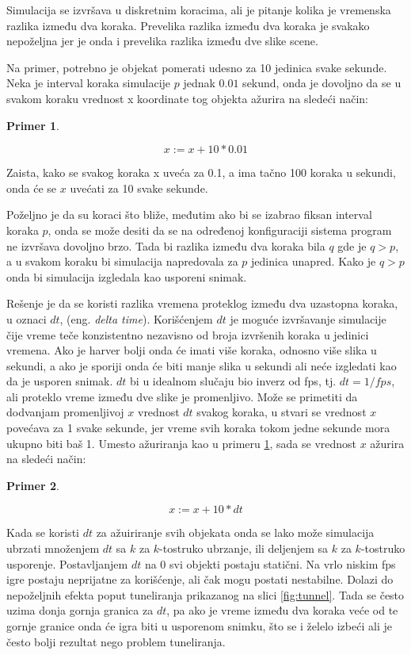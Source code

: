 \documentclass{article}
\newtheorem{primer}{Primer}[section]
\begin{document}
{Simulacija se izvršava u diskretnim koracima, ali je pitanje kolika je vremenska razlika između dva koraka.
Prevelika razlika između dva koraka je svakako nepoželjna jer je onda i prevelika razlika između dve slike scene.

Na primer, potrebno je objekat pomerati udesno za 10 jedinica svake sekunde. Neka je interval koraka simulacije 
$p$ jednak $0.01$ sekund, onda je dovoljno da se u svakom koraku vrednost x koordinate tog objekta ažurira na sledeći način:

\begin{primer}
\label{pr:x}

$$ x:= x + 10 * 0.01 $$
\end{primer}

Zaista, kako se svakog koraka x uveća za 0.1, a ima tačno 100 koraka u sekundi, onda će se $x$ uvećati za 10 svake sekunde.

Poželjno je da su koraci što bliže, međutim ako bi se izabrao fiksan interval koraka $p$, onda se može desiti
da se na određenoj konfiguraciji sistema program ne izvršava dovoljno brzo. 
Tada bi razlika između dva koraka bila $q$ gde je $q > p$, a u svakom koraku bi simulacija napredovala za 
$p$ jedinica unapred. Kako je $q > p$ onda bi simulacija izgledala kao usporeni snimak.

Rešenje je da se koristi razlika vremena proteklog između dva uzastopna koraka, u oznaci $dt$, (eng. {\em delta time}).
Korišćenjem $dt$ je moguće izvršavanje simulacije čije vreme teče konzistentno nezavisno od broja izvršenih koraka u 
jedinici vremena. Ako je harver bolji onda će imati više koraka, odnosno više slika u sekundi, a ako je 
sporiji onda će biti manje slika u sekundi ali neće izgledati kao da je usporen snimak.
$dt$ bi u idealnom slučaju bio inverz od fps, tj. $dt = 1/fps$, ali proteklo vreme između dve slike je promenljivo.
Može se primetiti da dodvanjam promenljivoj $x$ vrednost $dt$ svakog koraka, u stvari se vrednost $x$ povećava 
za 1 svake sekunde, jer vreme svih koraka tokom jedne sekunde mora ukupno biti baš 1.
Umesto ažuriranja kao u primeru \ref{pr:x}, sada se vrednost $x$ ažurira na sledeći način:
\begin{primer}
	\label{pr:x2}
	
	$$ x:= x + 10 * dt $$
\end{primer}

Kada se koristi $dt$ za ažuiriranje svih objekata onda se lako može simulacija ubrzati množenjem $dt$ 
sa $k$ za $k$-tostruko ubrzanje, ili deljenjem sa $k$ za $k$-tostruko usporenje. Postavljanjem $dt$ na 0 svi 
objekti postaju statični. 
Na vrlo niskim fps igre postaju neprijatne za korišćenje, ali čak mogu postati nestabilne. Dolazi do nepoželjnih efekta 
poput tuneliranja prikazanog na slici \ref{fig:tunnel}. Tada se često uzima donja gornja granica za $dt$, pa 
ako je vreme između dva koraka veće od te gornje granice onda će igra biti u usporenom snimku, što se i želelo izbeći 
ali je često bolji rezultat nego problem tuneliranja.

}
\end{document}
